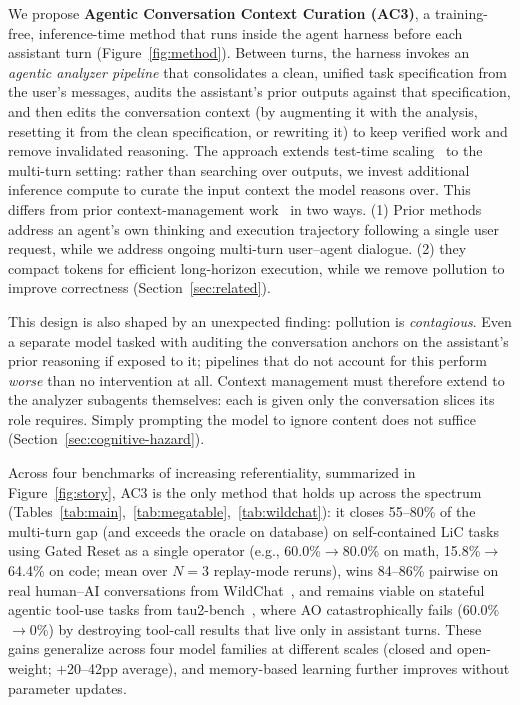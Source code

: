 \documentclass{article}
\newcommand{\methodfull}{Agentic Conversation Context Curation\xspace}
\newcommand{\method}{AC3\xspace}
\begin{document}
We propose \textbf{\methodfull{} (\method)}, a training-free, inference-time method that runs inside the agent harness before each assistant turn (Figure~\ref{fig:method}). Between turns, the harness invokes an \emph{agentic analyzer pipeline} that consolidates a clean, unified task specification from the user's messages, audits the assistant's prior outputs against that specification, and then edits the conversation context (by augmenting it with the analysis, resetting it from the clean specification, or rewriting it) to keep verified work and remove invalidated reasoning. The approach extends test-time scaling~\citep{wei2022chain,wang2023selfconsistency,yao2024tree,snell2024scalettc} to the multi-turn setting: rather than searching over outputs, we invest additional inference compute to curate the input context the model reasons over. This differs from prior context-management work~\citep[][\emph{inter alia}]{schroeder2025thread,zhang2025rlm,sun2025contextfolding} in two ways. (1) Prior methods address an agent's own thinking and execution trajectory following a single user request, while we address ongoing multi-turn user--agent dialogue. (2) they compact tokens for efficient long-horizon execution, while we remove pollution to improve correctness (Section~\ref{sec:related}).

This design is also shaped by an unexpected finding: pollution is \emph{contagious}. Even a separate model tasked with auditing the conversation anchors on the assistant's prior reasoning if exposed to it; pipelines that do not account for this perform \emph{worse} than no intervention at all. Context management must therefore extend to the analyzer subagents themselves: each is given only the conversation slices its role requires. Simply prompting the model to ignore content does not suffice (Section~\ref{sec:cognitive-hazard}).

Across four benchmarks of increasing referentiality, summarized in Figure~\ref{fig:story}, \method is the only method that holds up across the spectrum (Tables~\ref{tab:main},~\ref{tab:megatable},~\ref{tab:wildchat}): it closes 55--80\% of the multi-turn gap (and exceeds the oracle on database) on self-contained LiC tasks~\citep{laban2025lost} using Gated Reset as a single operator (e.g., 60.0\%$\to$80.0\% on math, 15.8\%$\to$64.4\% on code; mean over $N{=}3$ replay-mode reruns), wins 84--86\% pairwise on real human--AI conversations from WildChat~\citep{zhao2024wildchat}, and remains viable on stateful agentic tool-use tasks from tau2-bench~\citep{barres2025tau2}, where AO catastrophically fails (60.0\%$\to$0\%) by destroying tool-call results that live only in assistant turns. These gains generalize across four model families at different scales (closed and open-weight; +20--42pp average), and memory-based learning further improves without parameter updates.
\end{document}
